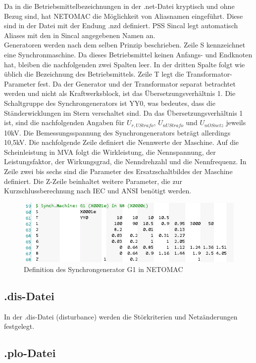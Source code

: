 \documentclass{scrartcl}
\begin{document}
\begin{onehalfspace}
Da in die Betriebsmittelbezeichnungen in der .net-Datei kryptisch und ohne Bezug sind, hat NETOMAC die Möglichkeit von Aliasnamen eingeführt. Diese sind in der Datei mit der Endung .nzd definiert. PSS Sincal legt automatisch Aliases mit den in Sincal angegebenen Namen an. \\
Generatoren werden nach dem selben Prinzip beschrieben. Zeile S kennzeichnet eine Synchronmaschine. Da dieses Betriebsmittel keinen Anfangs- und Endknoten hat, bleiben die nachfolgenden zwei Spalten leer. In der dritten Spalte folgt wie üblich die Bezeichnung des Betriebsmittels. Zeile T legt die Transformator-Parameter fest. Da der Generator und der Transformator separat betrachtet werden und nicht als Kraftwerksblock, ist das Übersetzungsverhältnis 1. Die Schaltgruppe des Synchrongenerators ist YY0, was bedeutes, dass die Ständerwicklungen im Stern verschaltet sind. Da das Übersetzungsverhältnis 1 ist, sind die nachfolgenden Angaben für $U_{r,UStrafo}$, $U_{nUStrafo}$ und $U_{nOSnetz}$ jeweils 10kV. Die Bemessungsspannung des Synchrongenerators beträgt allerdings 10,5kV. Die nachfolgende Zeile definiert die Nennwerte der Maschine. Auf die Scheinleistung in MVA folgt die Wirkleistung, die Nennspannung, der Leistungsfaktor, der Wirkungsgrad, die Nenndrehzahl und die Nennfrequenz. In Zeile zwei bis sechs sind die Parameter des Ersatzschaltbildes der Maschine definiert. Die Z-Zeile beinhaltet weitere Parameter, die zur Kurzschlussberechnung nach IEC und ANSI benötigt werden.

	\begin{figure}[H]
	\centering
	\includegraphics[scale=0.75]{img/netomac-g1.png}
	\caption{Definition des Synchrongenerator G1 in NETOMAC}
	\label{leitung-netomac}
	\end{figure}

\subsection{.dis-Datei}
In der .dis-Datei (\glqq disturbance\grqq) werden die Störkriterien und Netzänderungen festgelegt.

\subsection{.plo-Datei}

\end{onehalfspace}
\end{document}
